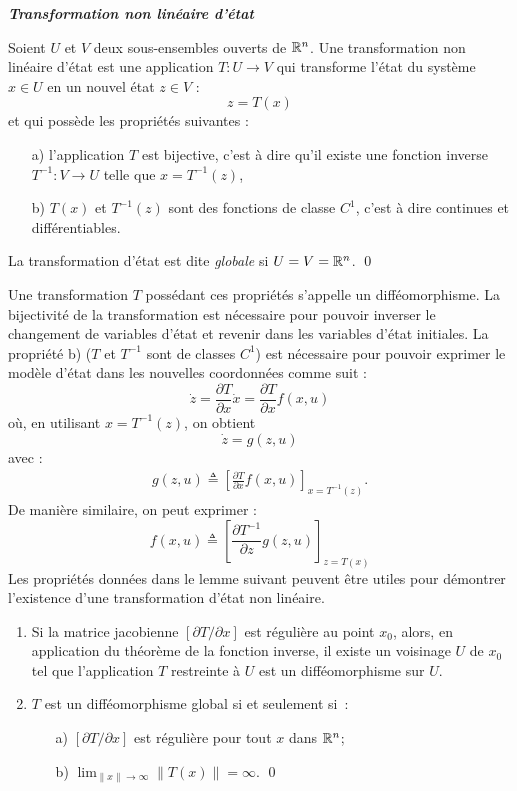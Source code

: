 \begin{definition}{\bf \em Transformation non linéaire d'état}

Soient $U$ et $V$ deux sous-ensembles ouverts de $\mathbb{R}^n$.  Une transformation non linéaire d'état est une application  $T : U
\rightarrow V$ qui transforme l'état du système $x \in U$ en
un nouvel état $z \in V$ :
$$
z = T(x)
$$
et qui possède les propriétés suivantes :
\begin{enumerate}
\item[a)] l'application $T$ est bijective, c'est à
dire qu'il existe une fonction inverse $T^{-1} : V
\rightarrow U$ telle que $x = T^{-1} (z)$,
\item[b)] $T(x)$ et $T^{-1}(z)$ sont des fonctions de
classe $C^{1}$, c'est à dire continues et différentiables.
\end{enumerate}
\noindent La transformation d'état est dite {\em globale} si $U=V=\mathbb{R}^n$. \qed
\end{definition}

Une transformation $T$ possédant ces propriétés 
s'appelle  un difféomorphisme.  La bijectivité de la transformation est nécessaire pour pouvoir inverser le changement de variables d'état et
revenir dans les variables d'état initiales.
La propriété b)  ($T$ et $T^{-1}$ sont de classes $C^1$)
est nécessaire pour pouvoir exprimer le modèle d'état dans les
nouvelles coordonnées comme suit :
$$
\dot z = \frac{\partial T}{\partial x} \dot x = \frac{\partial
T}{\partial x} f(x, u)
$$
où, en utilisant $x = T^{-1}(z)$, on obtient 
$$
\dot z = g(z,u)
$$
avec :
\begin{equation*} \begin{split} 
g(z,u) \triangleq \left[ \frac{\partial T}{\partial x}
f(x,u)\right ]_{x = T^{-1}(z)}.
\end{split} \end{equation*}
De manière similaire, on peut exprimer :
$$
f(x,u) \triangleq \left[\frac{\partial T^{-1}}{\partial z}
g(z,u)\right ]_{z = T(x)}
$$
Les propriétés données dans le lemme suivant peuvent être utiles pour démontrer l'existence d'une transformation d'état non linéaire.
\begin{lemme}{\blanc}
\begin{enumerate}
\item Si la matrice jacobienne $[\partial T/\partial x]$ est régulière au point $x_0$, alors, en application du théorème de la fonction inverse, il existe un voisinage $U$ de $x_0$ tel que l'application $T$ restreinte à $U$ est un difféomorphisme sur $U$.
\item $T$ est un difféomorphisme global si et seulement si~:
\begin{itemize}
\item[a)] $[\partial T/\partial x]$ est régulière pour tout $x$ dans $\mathbb{R}^n$;
\item[b)] $\lim_{\|x\|\rightarrow\infty}\|T(x)\| = \infty$. \qed
\end{itemize}
\end{enumerate}
\end{lemme}

